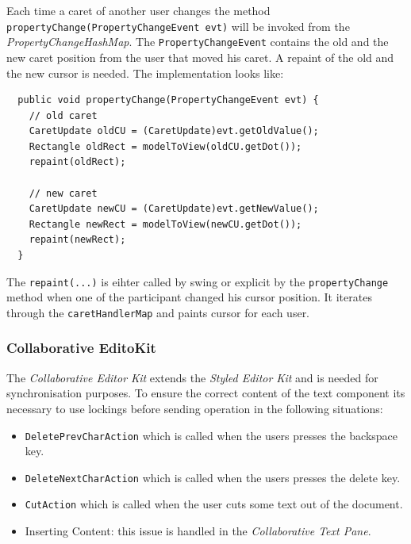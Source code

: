 Each time a caret of another user changes the method \texttt{propertyChange(PropertyChangeEvent evt)} will be invoked from the \textit{PropertyChangeHashMap}. The \texttt{PropertyChangeEvent} contains the old and the new caret position from the user that moved his caret. A repaint of the old and the new cursor is needed. The implementation looks like:
\begin{verbatim}
  public void propertyChange(PropertyChangeEvent evt) {
    // old caret
    CaretUpdate oldCU = (CaretUpdate)evt.getOldValue();
    Rectangle oldRect = modelToView(oldCU.getDot());
    repaint(oldRect);

    // new caret
    CaretUpdate newCU = (CaretUpdate)evt.getNewValue();
    Rectangle newRect = modelToView(newCU.getDot());
    repaint(newRect);
  }
\end{verbatim}
The \texttt{repaint(...)} is eihter called by swing or explicit by the \texttt{propertyChange} method when one of the participant changed his cursor position. It iterates through the \texttt{caretHandlerMap} and paints cursor for each user.

\subsubsection{Collaborative EditoKit}
\label{collaborative_editor_kit}
The \textit{Collaborative Editor Kit} extends the \textit{Styled Editor Kit} and is needed for synchronisation purposes. To ensure the correct content of the text component its necessary to use lockings before sending operation in the following situations:
\begin{itemize}
\item \texttt{DeletePrevCharAction} which is called when the users presses the backspace key.
\item \texttt{DeleteNextCharAction} which is called when the users presses the delete key.
\item \texttt{CutAction} which is called when the user cuts some text out of the document.
\item Inserting Content: this issue is handled in the \textit{Collaborative Text Pane}.
\end{itemize}


